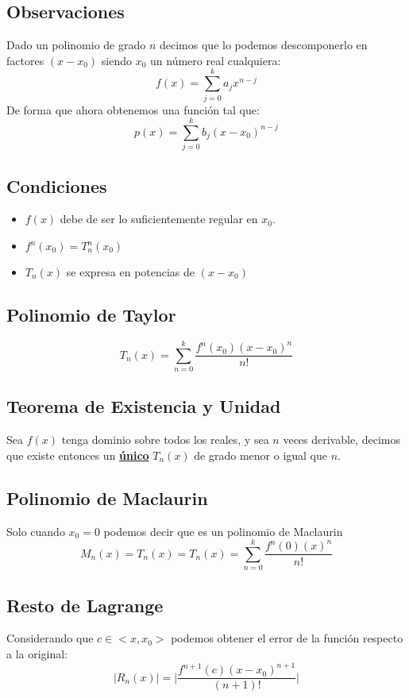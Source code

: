 \subsection{Observaciones}
\noindent Dado un polinomio de grado \(n\) decimos que lo podemos descomponerlo en factores \((x-x_0)\) siendo \(x_0\) un número real cualquiera:
\[
        f(x) = \sum^k_{j=0} a_jx^{n - j}
\]
\noindent De forma que ahora obtenemos una función tal que:
\[
        p(x) = \sum^k_{j=0} b_j(x-x_0)^{n - j}
\]
\subsection{Condiciones}
\begin{itemize}
        \item \(f(x)\) debe de ser lo suficientemente regular en \(x_0\).
        \item \(f^n(x_0) = T^n_n(x_0)\)
        \item \(T_n(x)\) se expresa en potencias de \((x-x_0)\)
\end{itemize}
\subsection{Polinomio de Taylor}
\[
        \boxed{T_n(x) = \sum^k_{n=0} \frac{f^n(x_0)(x-x_0)^n}{n!}}
\]
\subsection{Teorema de Existencia y Unidad}
\noindent Sea \(f(x)\) tenga dominio sobre todos los reales, y sea \(n\) veces derivable, decimos que existe entonces un \underline{\textbf{único}} \(T_n(x)\) de grado menor o igual que \(n\).
\subsection{Polinomio de Maclaurin}
\noindent Solo cuando \(x_0 = 0\) podemos decir que es un polinomio de Maclaurin
\[
        M_n(x) = T_n(x) = \boxed{T_n(x) = \sum^k_{n=0} \frac{f^n(0)(x)^n}{n!}}
\]
\subsection{Resto de Lagrange}
\noindent Considerando que \(c \in <x,x_0>\) podemos obtener el error de la función respecto a la original:
\[
        \left | R_n(x) \right | = \Big | \frac{f^{n+1}(c) (x-x_0)^{n+1}}{(n+1)!}\Big |
\]
